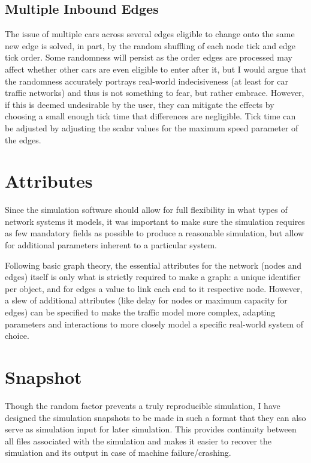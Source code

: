 \subsection{Multiple Inbound Edges}
\par The issue of multiple cars across several edges eligible to change onto the same new edge is solved, in part, by the random shuffling of each node tick and edge tick order.  Some randomness will persist as the order edges are processed may affect whether other cars are even eligible to enter after it, but I would argue that the randomness accurately portrays real-world indecisiveness (at least for car traffic networks) and thus is not something to fear, but rather embrace.  However, if this is deemed undesirable by the user, they can mitigate the effects by choosing a small enough tick time that differences are negligible.  Tick time can be adjusted by adjusting the scalar values for the maximum speed parameter of the edges.


\section{Attributes}

\par Since the simulation software should allow for full flexibility in what types of network systems it models, it was important to make sure the simulation requires as few mandatory fields as possible to produce a reasonable simulation, but allow for additional parameters inherent to a particular system.  \\

\par Following basic graph theory, the essential attributes for the network (nodes and edges) itself is only what is strictly required to make a graph:  a unique identifier per object, and for edges a value to link each end to it respective node. However, a slew of additional attributes (like delay for nodes or maximum capacity for edges) can be specified to make the traffic model more complex, adapting parameters and interactions to more closely model a specific real-world system of choice.



\section{Snapshot}

\par Though the random factor prevents a truly reproducible simulation, I have designed the simulation snapshots to be made in such a format that they can also serve as simulation input for later simulation.  This provides continuity between all files associated with the simulation and makes it easier to recover the simulation and its output in case of machine failure/crashing. \\


